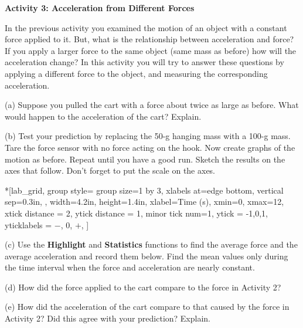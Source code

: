 \textbf{Activity 3: Acceleration from Different Forces }

In the previous activity you examined the motion of an object with a constant
force applied to it. But, what is the relationship between acceleration and
force? If you apply a larger force to the same object (same mass as before) how
will the acceleration change? In this activity you will try to answer these
questions by applying a different force to the object, and measuring the corresponding
acceleration. 

(a) Suppose you pulled the cart with a force about twice as large as before.
What would happen to the acceleration of the cart? Explain.
\answerspace{20mm}

\pagebreak[3]
(b) Test your prediction by replacing the 50-g hanging mass with a 100-g mass. Tare the force sensor with no force acting on the hook. Now create graphs of the motion as before.  Repeat until you have a good run. Sketch the results on the axes that follow. Don't forget to put the scale on the axes.

\begin{lab_groupplot}*{}[lab_grid,
	group style={
		group size=1 by 3,
		xlabels at=edge bottom,
		vertical sep=0.3in,
		},
	width=4.2in,  height=1.4in,
	xlabel=Time (s),
	xmin=0, xmax=12,
	xtick distance = 2, 
	ytick distance = 1, 
	minor tick num=1,
	ytick = {-1,0,1},
	yticklabels = {$-$, 0, $+$},
	]
\nextgroupplot[
	ymin=-1,ymax=1, 
	ylabel={Velocity (m/s)},
	]
\nextgroupplot[
	ymin=-1,ymax=1, 
	ylabel={Acceleration (m/s$^2$)},
	]
\nextgroupplot[
	ymin=-1,ymax=1, 
	ylabel={Force (N)},
	]
\end{lab_groupplot}


(c) Use the \textbf{Highlight} and  \textbf{Statistics} functions to find the 
average force and the average acceleration and record them below. Find the mean values only during the time interval when the force and acceleration are nearly constant.
\answerspace{20mm}

(d) How did the force applied to the cart compare to the force in Activity 2?
\answerspace{20mm}

(e) How did the acceleration of the cart compare to that caused by the force in Activity 2? Did this agree with your prediction? Explain.
\answerspace{20mm}

